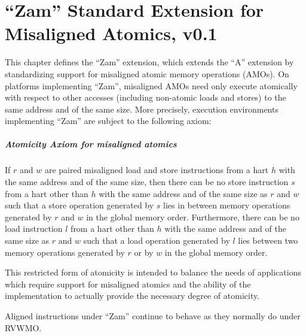 \chapter{``Zam'' Standard Extension for Misaligned Atomics, v0.1}
\label{sec:zam}

This chapter defines the ``Zam'' extension, which extends the ``A'' extension by standardizing support for misaligned atomic memory operations (AMOs).
On platforms implementing ``Zam'', misaligned AMOs need only execute atomically with respect
to other accesses (including non-atomic loads and stores) to the same address and of the same size.
More precisely, execution environments implementing ``Zam'' are subject to the following axiom:

\newcommand{\misalignedatomicityaxiom}{If $r$ and $w$ are paired misaligned load and store instructions from a hart $h$ with the same address and of the same size, then there can be no store instruction $s$ from a hart other than $h$ with the same address and of the same size as $r$ and $w$ such that a store operation generated by $s$ lies in between memory operations generated by $r$ and $w$ in the global memory order.  Furthermore, there can be no load instruction $l$ from a hart other than $h$ with the same address and of the same size as $r$ and $w$ such that a load operation generated by $l$ lies between two memory operations generated by $r$ or by $w$ in the global memory order.}

\vspace{-0.2in}
\paragraph{Atomicity Axiom for misaligned atomics}
\label{rvwmo:ax:misaligned}
\misalignedatomicityaxiom

This restricted form of atomicity is intended to balance the needs of applications which require support for misaligned atomics and the ability of the implementation to actually provide the necessary degree of atomicity.

Aligned instructions under ``Zam'' continue to behave as they normally do under RVWMO.

